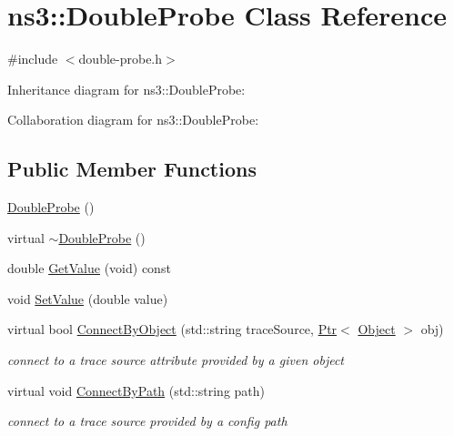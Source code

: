 \hypertarget{classns3_1_1DoubleProbe}{}\section{ns3\+:\+:Double\+Probe Class Reference}
\label{classns3_1_1DoubleProbe}


{\ttfamily \#include $<$double-\/probe.\+h$>$}



Inheritance diagram for ns3\+:\+:Double\+Probe\+:


Collaboration diagram for ns3\+:\+:Double\+Probe\+:
\subsection*{Public Member Functions}
\begin{DoxyCompactItemize}
\item 
\hyperlink{classns3_1_1DoubleProbe_a1a7b6f48125e55705943afcb2ed7c65f}{Double\+Probe} ()
\item 
virtual \hyperlink{classns3_1_1DoubleProbe_a9908e57933f074765d210a2f0a5e966a}{$\sim$\+Double\+Probe} ()
\item 
double \hyperlink{classns3_1_1DoubleProbe_a976a8ed5aba4f14cc211321dc4f6b420}{Get\+Value} (void) const 
\item 
void \hyperlink{classns3_1_1DoubleProbe_a640540e4d2593f8ed101599639f7ab92}{Set\+Value} (double value)
\item 
virtual bool \hyperlink{classns3_1_1DoubleProbe_a595c0fdc7e7c2e466cc8e9fc847580b0}{Connect\+By\+Object} (std\+::string trace\+Source, \hyperlink{classns3_1_1Ptr}{Ptr}$<$ \hyperlink{classns3_1_1Object}{Object} $>$ obj)
\begin{DoxyCompactList}\small\item\em connect to a trace source attribute provided by a given object \end{DoxyCompactList}\item 
virtual void \hyperlink{classns3_1_1DoubleProbe_a0f34962630dbb3af28c74c8b517824a7}{Connect\+By\+Path} (std\+::string path)
\begin{DoxyCompactList}\small\item\em connect to a trace source provided by a config path \end{DoxyCompactList}\end{DoxyCompactItemize}
